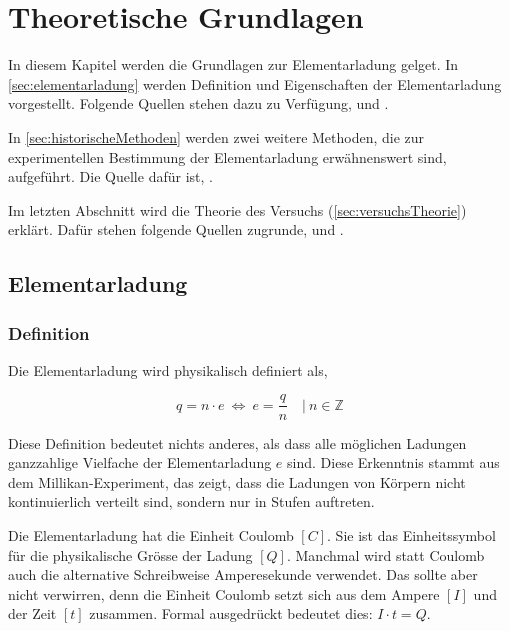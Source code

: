 \chapter{Theoretische Grundlagen}\label{ch:theorieGrundlagen}
In diesem Kapitel werden die Grundlagen zur Elementarladung gelget. In \autoref{sec:elementarladung} werden Definition und Eigenschaften der Elementarladung vorgestellt. Folgende Quellen stehen dazu zu Verfügung, \parencite{lernhelferElementarladungPhysik} und \parencite{enwiki:1263773841}.

In \autoref{sec:historischeMethoden} werden zwei weitere Methoden, die zur experimentellen Bestimmung der Elementarladung erwähnenswert sind, aufgeführt. Die Quelle dafür ist, \parencite{chatGPTMethodenBestimmung}.

Im letzten Abschnitt wird die Theorie des Versuchs (\autoref{sec:versuchsTheorie}) erklärt. Dafür stehen folgende Quellen zugrunde, \parencite[1-4, 12-13]{instructionManual} und \parencite[1-2, 9]{instructionManualHalogen}.

\section{Elementarladung}\label{sec:elementarladung}
\subsection{Definition}\label{sub:definition}
Die Elementarladung wird physikalisch definiert als,

\begin{equation}\label{eq:definition}
 q  =  n \cdot e \:  \Leftrightarrow \: e = \frac{q}{n} \quad | \ n \in \mathbb{Z}
\end{equation}

\noindent Diese Definition bedeutet nichts anderes, als dass alle möglichen Ladungen ganzzahlige Vielfache der Elementarladung $e$ sind. Diese Erkenntnis stammt aus dem Millikan-Experiment, das zeigt, dass die Ladungen von Körpern nicht kontinuierlich verteilt sind, sondern nur in Stufen auftreten.

Die Elementarladung hat die Einheit Coulomb $[C]$. Sie ist das Einheitssymbol für die physikalische Grösse der Ladung $[Q]$. Manchmal wird statt Coulomb auch die alternative Schreibweise Amperesekunde verwendet. Das sollte aber nicht verwirren, denn die Einheit Coulomb setzt sich aus dem Ampere $[I]$ und der Zeit $[t]$ zusammen. Formal ausgedrückt bedeutet dies: $I \cdot t = Q$. 

